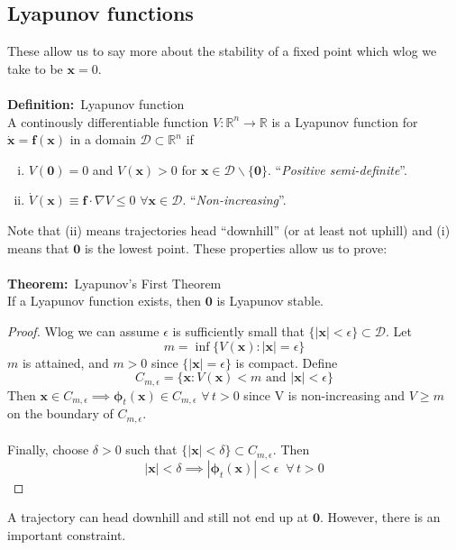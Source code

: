\documentclass{article}
\newcommand{\definition}{\textbf{Definition:}}              %
\newcommand{\theorem}{\textbf{Theorem:}}                    %
\newcommand{\bp}{\bm{\phi}}                                 %
\newcommand{\bx}{\bm{x}}                                    %
\newcommand{\xeq}[1] { \dot{\bm{ #1 }} = \bm{f}(\bm{ #1}) } %
\begin{document}
\subsection{Lyapunov functions}
These allow us to say more about the stability of a fixed point which wlog
we take to be $\bm{x}=0$.
\\
\\
\definition\ Lyapunov function
\\
A continously differentiable function $V : \mathbb{R}^n \to \mathbb{R}$ is a Lyapunov
function for $\xeq{x}$ in a domain $\mathcal{D} \subset \mathbb{R}^n$ if
%
\begin{enumerate}[(i)]
\item $V(\bm{0}) = 0$ and $V(\bm{x}) > 0$ for 
      $\bm{x} \in \mathcal{D} \backslash \{\bm{0}\}$.
     ``\emph{Positive semi-definite}''.

\item $\dot{V}(\bm{x}) \equiv \bm{f}\cdot \nabla V \leq 0$
      $\forall \bm{x} \in \mathcal{D}$. ``\emph{Non-increasing}''.

\end{enumerate}
%
Note that (ii) means trajectories head ``downhill'' (or at least not uphill)
and (i) means that $\bm{0}$ is the lowest point. These properties allow us to
prove:
\\
\\
\theorem\ Lyapunov's First Theorem
\\
If a Lyapunov function exists, then $\bm{0}$ is Lyapunov stable.
\begin{proof}
Wlog we can assume $\epsilon$ is sufficiently small that 
$\{ | \bm{x} | < \epsilon \} \subset\mathcal{D}$. Let
\[ m = \inf \{ V(\bm{x}) : | \bm{x} | = \epsilon \} \]
$m$ is attained, and $m>0$ since $\{ |\bm{x}| = \epsilon \}$ is compact.
Define
\[ C_{m, \epsilon}  = \{ \bx : V(\bx)<m \mbox{ and } |\bx| < \epsilon \} \]
Then $\bx \in C_{m,\epsilon} \implies \bp_t(\bx) \in C_{m,\epsilon}$ 
$\forall \, t>0$ since V is non-increasing and $V \geq m$ on the
boundary of $C_{m,\epsilon}$. 
\\
\\
Finally, choose $\delta >0$ such that 
$\{ |\bx| < \delta \} \subset C_{m,\epsilon}$. Then
\\
\[|\bx|< \delta \implies |\bp_t(\bx)|<\epsilon \;\; \forall \, t>0 \]
\end{proof}
%
%
\noindent
A trajectory can head downhill and still not end up at $\bm{0}$.
However, there is an important constraint.
\\
\end{document}
